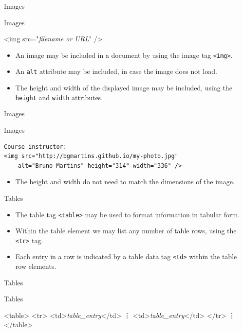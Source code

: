 \documentclass[svgnames]{beamer}
\begin{document}
\begin{frame}[fragile]{Images}
\small
\begin{block}{Images}
\begin{semiverbatim}
<img src="\emph{filename or URL}" />
\end{semiverbatim}
\end{block}
\normalsize
\begin{itemize}
	\item An image may be included in a document by using the image tag \texttt{<img>}.
	\item An \texttt{alt} attribute may be included, in case the image does not load.
	\item The height and width of the displayed image may be included, using the \texttt{height} and \texttt{width} attributes.
\end{itemize}
\end{frame}

\begin{frame}[fragile]{Images}
\scriptsize
\begin{block}{Images}
\begin{verbatim}
Course instructor: 
<img src="http://bgmartins.github.io/my-photo.jpg" 
	alt="Bruno Martins" height="314" width="336" />
\end{verbatim}
\end{block}
\normalsize
\begin{itemize}
	\item The height and width do not need to match the dimensions of the image.
\end{itemize}
\end{frame}

\begin{frame}[fragile]{Tables}
\begin{itemize}
	\item The table tag \texttt{<table>} may be used to format information in tabular form.
	\item Within the table element we may list any number of table rows, using the \texttt{<tr>} tag.
	\item Each entry in a row is indicated by a table data tag \texttt{<td>} within the table row elements.
\end{itemize}
\end{frame}

\begin{frame}[fragile]{Tables}
\small
\begin{block}{Tables}
\begin{semiverbatim}
<table>
    <tr>
        <td>\textit{table\_entry}</td>
            \vdots
        <td>\textit{table\_entry}</td>
    </tr>
        \vdots
</table>
\end{semiverbatim}
\end{block}
\end{frame}
\end{document}
